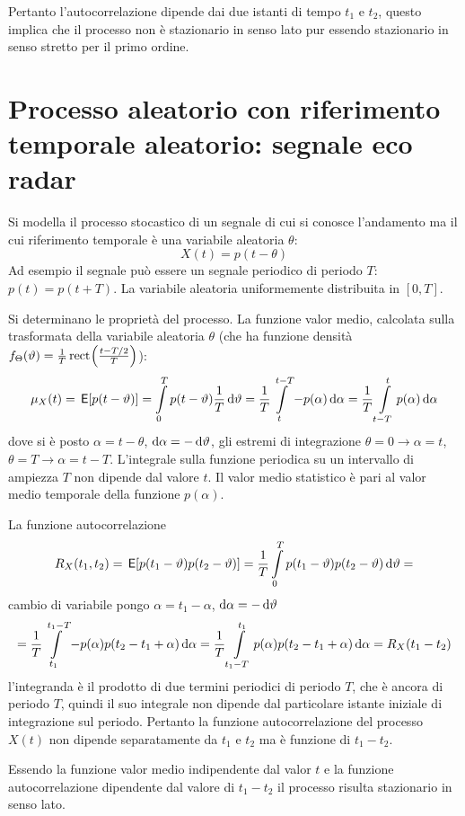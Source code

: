 Pertanto l'autocorrelazione dipende dai due istanti di tempo $t_1$ e $t_2$, questo implica che il processo non è stazionario in senso lato pur essendo stazionario in senso stretto per il primo ordine.

\section[Processo aleatorio con riferimento temporale aleatorio]{Processo aleatorio con riferimento temporale aleatorio: segnale eco radar}
Si modella il processo stocastico di un segnale di cui si conosce l'andamento ma il cui riferimento temporale è una variabile aleatoria $\theta$:
\begin{equation}X(t)=p(t-\theta)\end{equation}
Ad esempio il segnale può essere un segnale periodico di periodo $T$: $p(t)=p(t+T)$. La variabile aleatoria uniformemente distribuita in $[0,T]$.

Si determinano le proprietà del processo. La funzione valor medio, calcolata sulla trasformata della variabile aleatoria $\theta$ (che ha funzione densità $f_\Theta(\vartheta)=\frac{1}{T}\,{\operatorname{rect}}^{}\!\left({\frac{t-T/2}{T}}\right)$):
\[\mu_X(t)=\,{\operatorname{\mathsf{E}}}\!\left[{p(t-\vartheta)}\right]=\int\limits_{0}^{T}{p(t-\vartheta)\frac{1}{T}}{\,\mathop{}\!\mathrm{d}{\vartheta}}=\frac{1}{T}\int\limits_{t}^{t-T}{-p(\alpha)}{\,\mathop{}\!\mathrm{d}{\alpha}}=\frac{1}{T}\int\limits_{t-T}^{t}{p(\alpha)}{\,\mathop{}\!\mathrm{d}{\alpha}}\]
dove si è posto $\alpha=t-\theta$, $\mathop{}\!\mathrm{d}\alpha=-\mathop{}\!\mathrm{d}\vartheta$, gli estremi di integrazione $\theta=0\to\alpha=t$, $\theta=T\to\alpha=t-T$.
L'integrale sulla funzione periodica su un intervallo di ampiezza $T$ non dipende dal valore $t$. Il valor medio statistico è pari al valor medio temporale della funzione $p(\alpha)$.

La funzione autocorrelazione
\[R_X(t_1,t_2)=\,{\operatorname{\mathsf{E}}}\!\left[{p(t_1-\vartheta)p(t_2-\vartheta)}\right]=\frac{1}{T}\int\limits_{0}^{T}{p(t_1-\vartheta)p(t_2-\vartheta)}{\,\mathop{}\!\mathrm{d}{\vartheta}}=\]
cambio di variabile pongo $\alpha=t_1-\alpha$, $\mathop{}\!\mathrm{d}\alpha=-\mathop{}\!\mathrm{d}\vartheta$
\[=\frac{1}{T}\int\limits_{t_1}^{t_1-T}{-p(\alpha)p(t_2-t_1+\alpha)}{\,\mathop{}\!\mathrm{d}{\alpha}}=\frac{1}{T}\int\limits_{t_1-T}^{t_1}{p(\alpha)p(t_2-t_1+\alpha)}{\,\mathop{}\!\mathrm{d}{\alpha}}=R_X(t_1-t_2)\]
l'integranda è il prodotto di due termini periodici di periodo $T$, che è ancora di periodo $T$, quindi il suo integrale non dipende dal particolare istante iniziale di integrazione sul periodo. Pertanto la funzione autocorrelazione del processo $X(t)$ non dipende separatamente da $t_1$ e $t_2$ ma è funzione di $t_1-t_2$.

Essendo la funzione valor medio indipendente dal valor $t$ e la funzione autocorrelazione dipendente dal valore di $t_1-t_2$ il processo risulta stazionario in senso lato.

